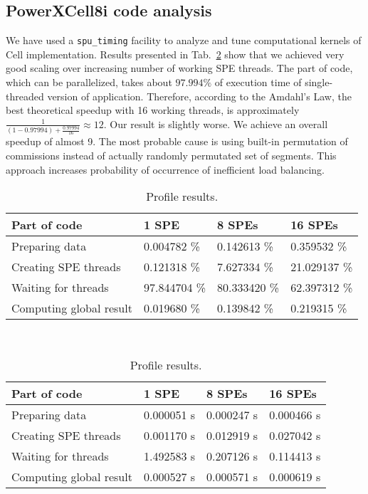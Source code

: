 \subsection{PowerXCell8i code analysis}
We have used a \texttt{spu\_timing} facility to analyze and tune computational
kernels of \prog{} Cell implementation.
Results presented in Tab.~\ref{tab:t3} show that we achieved
very good scaling over increasing number of working SPE threads.
The part of code, which can be parallelized, takes about $97.994\%$ of execution
time of single-threaded version of application.
Therefore, according to the Amdahl's Law, the best theoretical speedup with 16
working threads, is approximately
$\frac{1}{(1-0.97994) + \frac{0.97994}{16}}\approx12$.
Our result is slightly worse.
We achieve an overall speedup of almost 9.
The most probable cause is using built-in permutation of commissions instead of
actually randomly permutated set of segments.
This approach increases probability of occurrence of inefficient load balancing.
\begin{table}[htb]
\begin{footnotesize}
\caption{Profile results.}
\label{tab:t3}
\newcommand{\m}{\hphantom{$-$}}
\newcommand{\cc}[1]{\multicolumn{1}{c}{#1}}
\renewcommand{\tabcolsep}{0.5pc} %
\renewcommand{\arraystretch}{1.2} %
\begin{tabular}{@{}llll}
\hline
\textbf{Part of code} & \textbf{1 SPE} & \textbf{8 SPEs} & \textbf{16 SPEs} \\
\hline
Preparing data & 0.004782 \% & 0.142613 \% & 0.359532 \% \\
Creating  SPE threads & 0.121318 \% & 7.627334 \% & 21.029137 \% \\
Waiting for threads & 97.844704 \% & 80.333420 \% & 62.397312 \% \\
Computing global result & 0.019680 \% & 0.139842 \% & 0.219315 \% \\
\hline
\end{tabular}\\[2pt]

\bigskip

\begin{tabular}{@{}llll}
\hline
\textbf{Part of code} & \textbf{1 SPE} & \textbf{8 SPEs} & \textbf{16 SPEs} \\
\hline
Preparing data & 0.000051 s & 0.000247 s & 0.000466 s \\
Creating  SPE threads & 0.001170 s & 0.012919 s & 0.027042 s \\
Waiting for threads & 1.492583 s & 0.207126 s & 0.114413 s \\
Computing global result & 0.000527 s & 0.000571 s & 0.000619 s \\
\hline
\end{tabular}\\[2pt]
\end{footnotesize}
\end{table}

